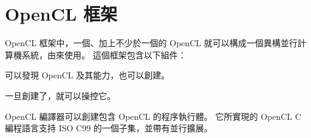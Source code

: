 \section{OpenCL 框架}
OpenCL 框架中，一個、加上不少於一個的 OpenCL 就可以構成一個異構並行計算機系統，由來使用。
這個框架包含以下組件：
\startigBase
\item {}可以發現 OpenCL 及其能力，也可以創建。

\item {}一旦創建了，就可以操控它。

\item {}OpenCL 編譯器可以創建包含 OpenCL 的程序執行體。
它所實現的 OpenCL C 編程語言支持 ISO C99 的一個子集，並帶有並行擴展。
\stopigBase

